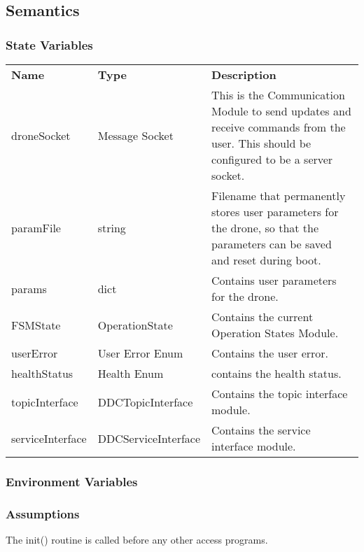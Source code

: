 \documentclass[12pt, titlepage]{article}
\begin{document}
\subsection{Semantics}
\subsubsection{State Variables}
\begin{center}
\begin{tabular}{p{3 cm} p{4cm} p{7cm} }
\hline
\textbf{Name} & \textbf{Type} & \textbf{Description}  \\
droneSocket & Message Socket & This is the Communication Module to send updates and receive commands from the user. This should be configured to be a server socket. \\
paramFile & string & Filename that permanently stores user parameters for the drone, so that the parameters can be saved and reset during boot. \\
params & dict & Contains user  parameters for the drone. \\
FSMState & OperationState & Contains the current Operation States Module. \\
userError & User Error Enum & Contains the user error. \\
healthStatus & Health Enum & contains the health status.\\
topicInterface & DDCTopicInterface & Contains the topic interface module.  \\
serviceInterface & DDCServiceInterface & Contains the service interface module.  \\
\hline
\hline
\end{tabular}
\end{center}
\subsubsection{Environment Variables}
\subsubsection{Assumptions}
The init() routine is called before any other access programs.
\end{document}
